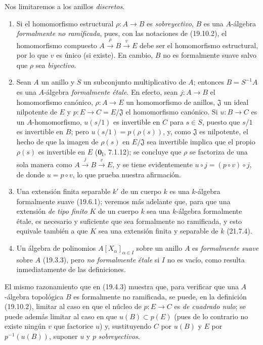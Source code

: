 
\begin{examples}[19.10.3]
\label{0.19.10.3-fr}
Nos limitaremos a los anillos \emph{discretos}.
\begin{enumerate}
  \item[(i)] Si el homomorfismo estructural $\rho:A\to B$ es
  \emph{sobreyectivo}, $B$ es una $A$-álgebra \emph{formalmente no ramificada},
  pues, con las notaciones de (19.10.2), el homomorfismo compuesto
  $A\xrightarrow{\rho}B\xrightarrow{v}E$ debe ser el homomorfismo estructural, por
  lo que $v$ es único (si existe). En cambio, $B$ no es formalmente suave salvo
  que $\rho$ sea \emph{biyectivo}.
  \item[(ii)] Sean $A$ un anillo y $S$ un subconjunto multiplicativo de $A$;
  entonces $B=S^{-1}A$ es una $A$-álgebra \emph{formalmente étale}. En efecto,
  sean $j:A\to B$ el homomorfismo canónico, $\rho:A\to E$ un homomorfismo de
  anillos, $\mathfrak J$ un ideal nilpotente de $E$ y
  $p:E\to C=E/\mathfrak J$ el homomorfismo canónico. Si $u:B\to C$ es un
  $A$-homomorfismo, $u(s/1)$ es invertible en $C$ para $s\in S$, puesto que
  $s/1$ es invertible en $B$; pero $u(s/1)=p(\rho(s))$, y, como $\mathfrak J$
  es nilpotente, el hecho de que la imagen de $\rho(s)$ en $E/\mathfrak J$ sea
  invertible implica que el propio $\rho(s)$ es invertible en $E$
  ($\mathbf 0_{\mathrm I}$, 7.1.12); se concluye que $\rho$ se factoriza de una
  sola manera como $A\xrightarrow{j}B\xrightarrow{v}E$, y se tiene
  evidentemente $u\circ j=(p\circ v)\circ j$, de donde $u=p\circ v$, lo que
  prueba nuestra afirmación.
  \item[(iii)] Una extensión finita separable $k'$ de un cuerpo $k$ es una
  $k$-álgebra formalmente suave (19.6.1); veremos más adelante que, para que una
  extensión \emph{de tipo finito} $K$ de un cuerpo $k$ sea una $k$-álgebra
  formalmente étale, es necesario y suficiente que sea formalmente no
  ramificada, y esto equivale también a que $K$ sea una extensión finita y
  separable de $k$ (21.7.4).
  \item[(iv)] Un álgebra de polinomios $A[X_\alpha]_{\alpha\in I}$ sobre un
  anillo $A$ es \emph{formalmente suave} sobre $A$ (19.3.3), pero \emph{no
  formalmente étale} si $I$ no es vacío, como resulta inmediatamente de las
  definiciones.
\end{enumerate}
\end{examples}

\begin{remark}[19.10.4]
\label{0.19.10.4-fr}
El mismo razonamiento que en (19.4.3) muestra que, para verificar que una
$A$-álgebra topológica $B$ es formalmente no ramificada, se puede, en la
definición (19.10.2), limitar al caso en que el núcleo de $p:E\to C$ es
\emph{de cuadrado nulo}; se puede además limitar al caso en que $u(B)\subset p(E)$
(pues de lo contrario no existe ningún $v$ que factorice $u$) y, sustituyendo
$C$ por $u(B)$ y $E$ por $p^{-1}(u(B))$, suponer $u$ y $p$ \emph{sobreyectivos}.
\end{remark}
